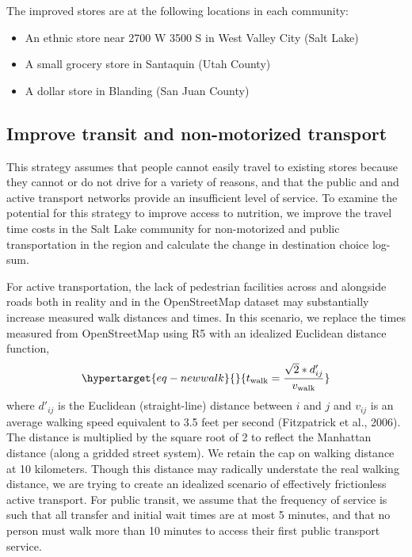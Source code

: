 \documentclass[
  letterpaper,
  DIV=11,
  numbers=noendperiod]{scrreport}
\providecommand{\tightlist}{%
  \setlength{\itemsep}{0pt}\setlength{\parskip}{0pt}}\usepackage{longtable,booktabs,array}
\begin{document}
The improved stores are at the following locations in each community:

\begin{itemize}
\tightlist
\item
  An ethnic store near 2700 W 3500 S in West Valley City (Salt Lake)
\item
  A small grocery store in Santaquin (Utah County)
\item
  A dollar store in Blanding (San Juan County)
\end{itemize}

\hypertarget{improve-transit-and-non-motorized-transport}{%
\subsection{Improve transit and non-motorized
transport}\label{improve-transit-and-non-motorized-transport}}

This strategy assumes that people cannot easily travel to existing
stores because they cannot or do not drive for a variety of reasons, and
that the public and and active transport networks provide an
insufficient level of service. To examine the potential for this
strategy to improve access to nutrition, we improve the travel time
costs in the Salt Lake community for non-motorized and public
transportation in the region and calculate the change in destination
choice log-sum.

For active transportation, the lack of pedestrian facilities across and
alongside roads both in reality and in the OpenStreetMap dataset may
substantially increase measured walk distances and times. In this
scenario, we replace the times measured from OpenStreetMap using R5 with
an idealized Euclidean distance function,
\begin{equation}\protect\hypertarget{eq-newwalk}{}{
t_{\mathrm{walk}} = \frac{\sqrt{2} * d'_{ij}}{v_{\mathrm{walk}}}
}\label{eq-newwalk}\end{equation} where \(d'_{ij}\) is the Euclidean
(straight-line) distance between \(i\) and \(j\) and \(v_{ij}\) is an
average walking speed equivalent to 3.5 feet per second (Fitzpatrick et
al., 2006). The distance is multiplied by the square root of 2 to
reflect the Manhattan distance (along a gridded street system). We
retain the cap on walking distance at 10 kilometers. Though this
distance may radically understate the real walking distance, we are
trying to create an idealized scenario of effectively frictionless
active transport. For public transit, we assume that the frequency of
service is such that all transfer and initial wait times are at most 5
minutes, and that no person must walk more than 10 minutes to access
their first public transport service.
\end{document}
